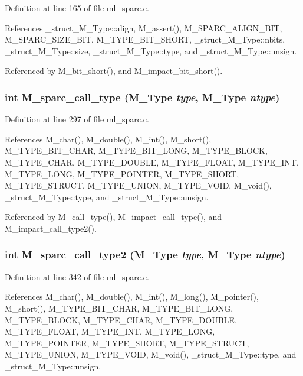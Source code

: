 Definition at line 165 of file ml\_\-sparc.c.

References \_\-struct\_\-M\_\-Type::align, M\_\-assert(), M\_\-SPARC\_\-ALIGN\_\-BIT, M\_\-SPARC\_\-SIZE\_\-BIT, M\_\-TYPE\_\-BIT\_\-SHORT, \_\-struct\_\-M\_\-Type::nbits, \_\-struct\_\-M\_\-Type::size, \_\-struct\_\-M\_\-Type::type, and \_\-struct\_\-M\_\-Type::unsign.

Referenced by M\_\-bit\_\-short(), and M\_\-impact\_\-bit\_\-short().
\subsubsection{\setlength{\rightskip}{0pt plus 5cm}int M\_\-sparc\_\-call\_\-type (\bf{M\_\-Type} {\em type}, \bf{M\_\-Type} {\em ntype})}\label{ml__sparc_8c_a039a192cee4a703c159455243cadc26}




Definition at line 297 of file ml\_\-sparc.c.

References M\_\-char(), M\_\-double(), M\_\-int(), M\_\-short(), M\_\-TYPE\_\-BIT\_\-CHAR, M\_\-TYPE\_\-BIT\_\-LONG, M\_\-TYPE\_\-BLOCK, M\_\-TYPE\_\-CHAR, M\_\-TYPE\_\-DOUBLE, M\_\-TYPE\_\-FLOAT, M\_\-TYPE\_\-INT, M\_\-TYPE\_\-LONG, M\_\-TYPE\_\-POINTER, M\_\-TYPE\_\-SHORT, M\_\-TYPE\_\-STRUCT, M\_\-TYPE\_\-UNION, M\_\-TYPE\_\-VOID, M\_\-void(), \_\-struct\_\-M\_\-Type::type, and \_\-struct\_\-M\_\-Type::unsign.

Referenced by M\_\-call\_\-type(), M\_\-impact\_\-call\_\-type(), and M\_\-impact\_\-call\_\-type2().
\subsubsection{\setlength{\rightskip}{0pt plus 5cm}int M\_\-sparc\_\-call\_\-type2 (\bf{M\_\-Type} {\em type}, \bf{M\_\-Type} {\em ntype})}\label{ml__sparc_8c_ed61a397557aa9e21962de679ee7acc8}




Definition at line 342 of file ml\_\-sparc.c.

References M\_\-char(), M\_\-double(), M\_\-int(), M\_\-long(), M\_\-pointer(), M\_\-short(), M\_\-TYPE\_\-BIT\_\-CHAR, M\_\-TYPE\_\-BIT\_\-LONG, M\_\-TYPE\_\-BLOCK, M\_\-TYPE\_\-CHAR, M\_\-TYPE\_\-DOUBLE, M\_\-TYPE\_\-FLOAT, M\_\-TYPE\_\-INT, M\_\-TYPE\_\-LONG, M\_\-TYPE\_\-POINTER, M\_\-TYPE\_\-SHORT, M\_\-TYPE\_\-STRUCT, M\_\-TYPE\_\-UNION, M\_\-TYPE\_\-VOID, M\_\-void(), \_\-struct\_\-M\_\-Type::type, and \_\-struct\_\-M\_\-Type::unsign.

